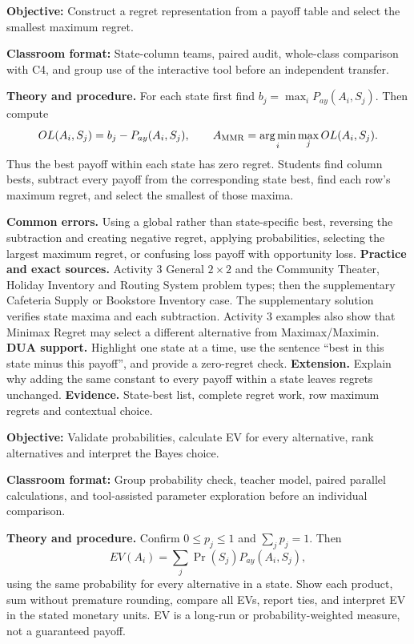 \documentclass[10pt,letterpaper]{article}
\newcommand{\labelled}[2]{\textbf{#1:} #2\par}
\newcommand{\partheading}[1]{\Needspace{6\baselineskip}\par\vspace{5pt}{\bfseries #1\par}\vspace{1pt}}
\begin{document}
	\vspace{5pt}
	\begin{bluebox}
		\fontsize{8.35}{10.55}\selectfont
		\partheading{Part 1---C5: Opportunity Loss and Minimax Regret}
		\labelled{Objective}{Construct a regret representation from a payoff table and select the smallest maximum regret.}
		\labelled{Classroom format}{State-column teams, paired audit, whole-class comparison with C4, and group use of the interactive tool before an independent transfer.}
		\textbf{Theory and procedure.} For each state first find
		$b_j=\max_iP_{ay}(A_i,S_j)$. Then compute
		\[
		OL(A_i,S_j)=b_j-P_{ay}(A_i,S_j),\qquad
		A_{\rm MMR}=\operatorname*{arg\,min}_i\max_jOL(A_i,S_j).
		\]
		Thus the best payoff within each state has zero regret. Students find column
		bests, subtract every payoff from the corresponding state best, find each
		row's maximum regret, and select the smallest of those maxima.
		
		\textbf{Common errors.} Using a global rather than state-specific best,
		reversing the subtraction and creating negative regret, applying probabilities,
		selecting the largest maximum regret, or confusing loss payoff with opportunity
		loss. \textbf{Practice and exact sources.} Activity 3 General $2\times2$ and
		the Community Theater, Holiday Inventory and Routing System problem types;
		then the supplementary Cafeteria Supply or Bookstore Inventory case. The
		supplementary solution verifies state maxima and each subtraction. Activity 3
		examples also show that Minimax Regret may select a different alternative from
		Maximax/Maximin. \textbf{DUA support.} Highlight one state at a time, use the
		sentence ``best in this state minus this payoff'', and provide a zero-regret
		check. \textbf{Extension.} Explain why adding the same constant to every payoff
		within a state leaves regrets unchanged. \textbf{Evidence.} State-best list,
		complete regret work, row maximum regrets and contextual choice.
		
		\partheading{Part 2---C6: Expected Monetary Value and Bayes Choice}
		\labelled{Objective}{Validate probabilities, calculate EV for every alternative, rank alternatives and interpret the Bayes choice.}
		\labelled{Classroom format}{Group probability check, teacher model, paired parallel calculations, and tool-assisted parameter exploration before an individual comparison.}
		\textbf{Theory and procedure.} Confirm $0\leq p_j\leq1$ and
		$\sum_jp_j=1$. Then
		\[
		EV(A_i)=\sum_j\Pr(S_j)P_{ay}(A_i,S_j),
		\]
		using the same probability for every alternative in a state. Show each product,
		sum without premature rounding, compare all EVs, report ties, and interpret EV
		in the stated monetary units. EV is a long-run or probability-weighted measure,
		not a guaranteed payoff.
		

\end{bluebox}
\end{document}

